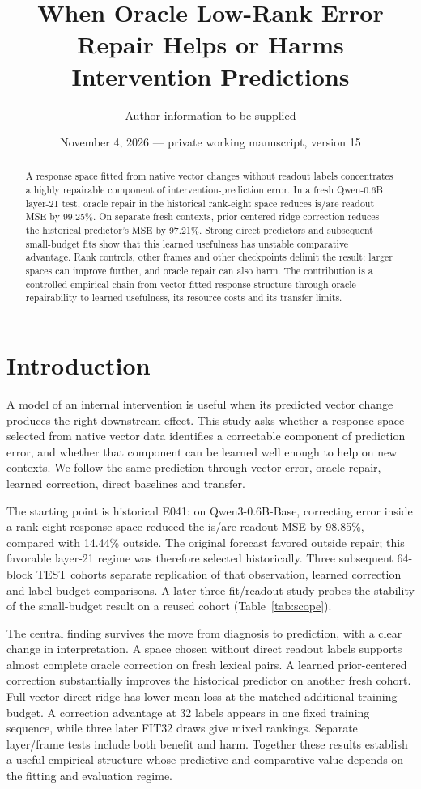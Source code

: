 \documentclass[11pt]{article}
\title{When Oracle Low-Rank Error Repair Helps or Harms\\Intervention Predictions}
\author{Author information to be supplied}
\date{November 4, 2026 --- private working manuscript, version 15}
\begin{document}
\maketitle
\begin{abstract}
A response space fitted from native vector changes without readout labels concentrates a highly repairable component of intervention-prediction error. In a fresh Qwen-0.6B layer-21 test, oracle repair in the historical rank-eight space reduces is/are readout MSE by 99.25\%. On separate fresh contexts, prior-centered ridge correction reduces the historical predictor's MSE by 97.21\%. Strong direct predictors and subsequent small-budget fits show that this learned usefulness has unstable comparative advantage. Rank controls, other frames and other checkpoints delimit the result: larger spaces can improve further, and oracle repair can also harm. The contribution is a controlled empirical chain from vector-fitted response structure through oracle repairability to learned usefulness, its resource costs and its transfer limits.
\end{abstract}

\section{Introduction}
A model of an internal intervention is useful when its predicted vector change produces the right downstream effect. This study asks whether a response space selected from native vector data identifies a correctable component of prediction error, and whether that component can be learned well enough to help on new contexts. We follow the same prediction through vector error, oracle repair, learned correction, direct baselines and transfer.

The starting point is historical E041: on Qwen3-0.6B-Base, correcting error inside a rank-eight response space reduced the is/are readout MSE by 98.85\%, compared with 14.44\% outside. The original forecast favored outside repair; this favorable layer-21 regime was therefore selected historically. Three subsequent 64-block TEST cohorts separate replication of that observation, learned correction and label-budget comparisons. A later three-fit/readout study probes the stability of the small-budget result on a reused cohort (Table~\ref{tab:scope}).

The central finding survives the move from diagnosis to prediction, with a clear change in interpretation. A space chosen without direct readout labels supports almost complete oracle correction on fresh lexical pairs. A learned prior-centered correction substantially improves the historical predictor on another fresh cohort. Full-vector direct ridge has lower mean loss at the matched additional training budget. A correction advantage at 32 labels appears in one fixed training sequence, while three later FIT32 draws give mixed rankings. Separate layer/frame tests include both benefit and harm. Together these results establish a useful empirical structure whose predictive and comparative value depends on the fitting and evaluation regime.
\end{document}
